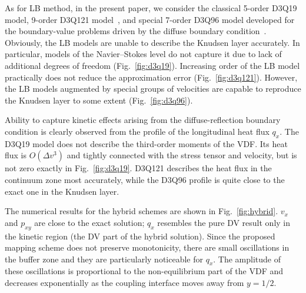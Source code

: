 \documentclass[]{elsarticle} %
\newcommand{\OO}[1]{O(#1)}
\begin{document}
As for LB method, in the present paper, we consider the classical 5-order D3Q19 model, 9-order D3Q121 model~\cite{Shan2010},
and special 7-order D3Q96 model developed for the boundary-value problems driven by the diffuse boundary condition~\cite{Feuchter2016}.
Obviously, the LB models are unable to describe the Knudsen layer accurately.
In particular, models of the Navier--Stokes level do not capture it due to lack of additional degrees of freedom (Fig.~\ref{fig:d3q19}).
Increasing order of the LB model practically does not reduce the approximation error (Fig.~\ref{fig:d3q121}).
However, the LB models augmented by special groups of velocities are capable to reproduce the Knudsen layer to some extent (Fig.~\ref{fig:d3q96}).

Ability to capture kinetic effects arising from the diffuse-reflection boundary condition
is clearly observed from the profile of the longitudinal heat flux \(q_x\).
The D3Q19 model does not describe the third-order moments of the VDF.
Its heat flux is \(\OO{\Delta v^3}\) and tightly connected with the stress tensor and velocity, but is not zero exactly in Fig.~\ref{fig:d3q19}.
D3Q121 describes the heat flux in the continuum zone most accurately, while the D3Q96 profile is quite close to the exact one in the Knudsen layer.

The numerical results for the hybrid schemes are shown in Fig.~\ref{fig:hybrid}.
\(v_x\) and \(p_{xy}\) are close to the exact solution;
\(q_x\) resembles the pure DV result only in the kinetic region (the DV part of the hybrid solution).
Since the proposed mapping scheme does not preserve monotonicity,
there are small oscillations in the buffer zone and they are particularly noticeable for \(q_x\).
The amplitude of these oscillations is proportional to the non-equilibrium part of the VDF
and decreases exponentially as the coupling interface moves away from \(y=1/2\).
\end{document}
